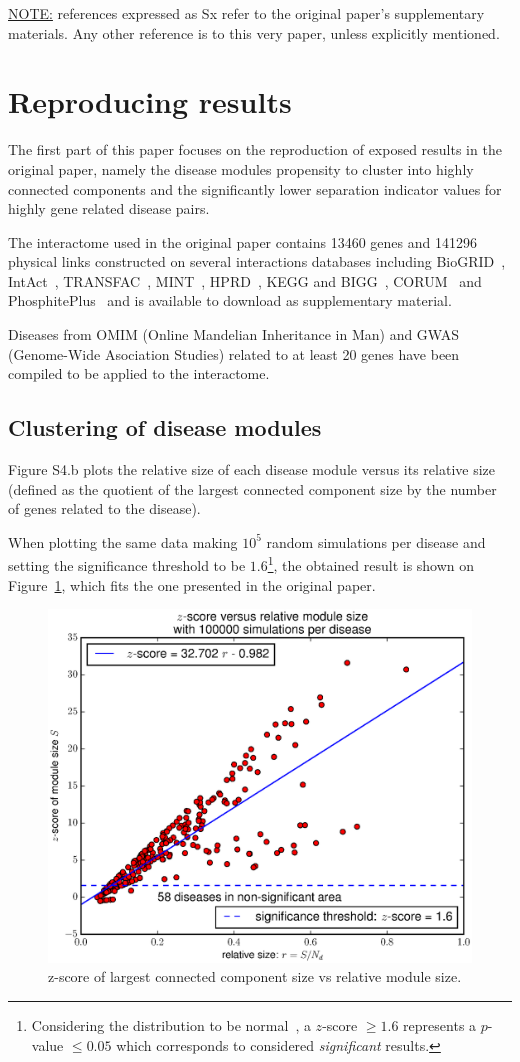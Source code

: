 \documentclass[letterpaper]{article}
\begin{document}
\underline{NOTE:} references expressed as Sx refer to the original paper's supplementary materials. Any
other reference is to this very paper, unless explicitly mentioned.

\section{Reproducing results}
The first part of this paper focuses on the reproduction of exposed results in the original paper,
namely the disease modules propensity to cluster into highly connected components and the significantly
lower separation indicator values for highly gene related disease pairs.

The interactome used in the original paper contains 13460 genes and 141296 physical links constructed on several
interactions databases including BioGRID~\citep{chatr2017biogrid}, IntAct~\citep{kerrien2011intact},
TRANSFAC~\citep{matys2003transfac}, MINT~\citep{licata2011mint}, HPRD~\citep{keshava2008HPRD}, KEGG and
BIGG~\cite{lee2008KEGG-BIGG}, CORUM~\citep{ruepp2009corum} and PhosphitePlus~\citep{hornbeck2011phosphositeplus}
and is available to download as supplementary material.

Diseases from OMIM (Online Mandelian Inheritance in Man) and GWAS (Genome-Wide Asociation Studies)
related to at least 20 genes have been compiled to be applied to the interactome.

	\subsection{Clustering of disease modules}\label{subsec:clustering of disease modules}
	Figure S4.b plots the relative size of each disease module versus its relative size (defined as the
	quotient of the largest connected component size by the number of genes related to the disease).

	When plotting the same data making $10^5$ random simulations per disease and setting the significance
	threshold to be $1.6$\footnote{Considering the distribution to be normal~\citep{fluctuationGiantComponent},
	a $z$-score $\geq 1.6$ represents a $p$-value $\leq 0.05$ which corresponds to considered
	\textit{significant} results.}, the obtained result is shown on
	Figure~\ref{fig:zscore}, which fits the one presented in the original paper.

	\begin{figure}[!h]
		\includegraphics[width=.5\textwidth]{images/S4.b100000.eps}
		\caption{z-score of largest connected component size vs relative module size.\label{fig:zscore}}
	\end{figure}
\end{document}
